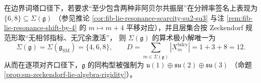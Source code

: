 \begin{corollary}\label{cor:sm-minimal-triple-selection-law}
在边界词塔口径下，若要求“至少包含两种非阿贝尔共振层”在分辨率签名上表现为
\(
\{6,8\}\subseteq \Sigma(\mathfrak g)
\)
（参见推论 \ref{cor:fib-lie-resonance-scarcity-su2-su3} 与注 \ref{rem:fib-lie-resonance-shift-by-4} 的 \(m\mapsto m+4\) 平移对应），并且层集合按 Zeckendorf 规范形取“无相邻指标、无冗余激活”，
则 \(\Sigma(\mathfrak g)\) 的算术极小解唯一为
\[
\Sigma(\mathfrak g)=\Sigma(\mathfrak g_{\mathrm{SM}})=\{4,6,8\},
\qquad
D=\sum_{m\in\Sigma(\mathfrak g)}|X_m^{\mathrm{bdry}}|=1+3+8=12.
\]
从而在逐项对齐口径下，\(\mathfrak g\) 的同构型被强制为
\(
\mathfrak u(1)\oplus\mathfrak{su}(2)\oplus\mathfrak{su}(3)
\)
（命题 \ref{prop:sm-zeckendorf-lie-algebra-rigidity}）。
\end{corollary}
